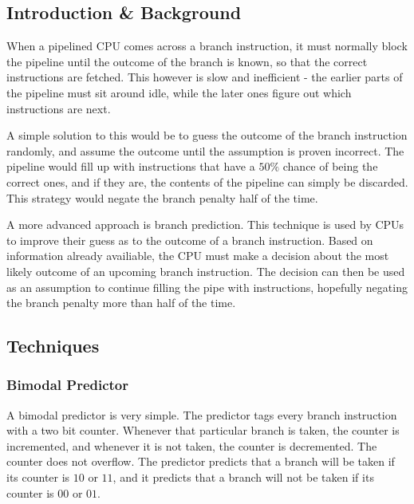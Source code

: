 
\subsection{Introduction \& Background}

When a pipelined CPU comes across a branch instruction, it must normally
block the pipeline until the outcome of the branch is known, so that the
correct instructions are fetched. This however is slow and inefficient -
the earlier parts of the pipeline must sit around idle, while the later
ones figure out which instructions are next.

A simple solution to this would be to guess the outcome of the branch
instruction randomly, and assume the outcome until the assumption is
proven incorrect.
The pipeline would fill up with instructions that have a \(50\%\) chance
of being the correct ones, and if they are, the contents of the pipeline
can simply be discarded.
This strategy would negate the branch penalty half of the time.

A more advanced approach is branch prediction.
This technique is used by CPUs to improve their guess as to the outcome of
a branch instruction.
Based on information already availiable, the CPU must make a decision about
the most likely outcome of an upcoming branch instruction. The decision can
then be used as an assumption to continue filling the pipe with instructions,
hopefully negating the branch penalty more than half of the time.

\subsection{Techniques}

\subsubsection{Bimodal Predictor}

A bimodal predictor is very simple.
The predictor tags every branch instruction with a two bit counter.
Whenever that particular branch is taken, the counter is incremented,
and whenever it is not taken, the counter is decremented.
The counter does not overflow.
The predictor predicts that a branch will be taken if its counter
is \(10\) or \(11\), and it predicts that a branch will not be taken
if its counter is \(00\) or \(01\).

